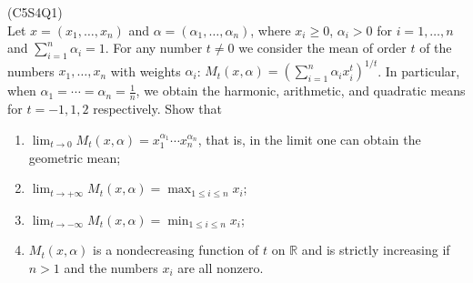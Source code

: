 \begin{prb}
    (C5S4Q1) \\
    Let $x = (x_1, \ldots, x_n)$ and $\alpha = (\alpha_1, \ldots, \alpha_n)$, where $x_i \geq 0$, $\alpha_i > 0$ for $i = 1, \ldots, n$ and $\sum_{i=1}^n \alpha_i = 1$. For any number $t \neq 0$ we consider the mean of order $t$ of the numbers $x_1, \ldots, x_n$ with weights $\alpha_i$: $M_t(x, \alpha) = \left( \sum_{i=1}^n \alpha_i x_i^t \right)^{1/t}$.
    In particular, when $\alpha_1 = \cdots = \alpha_n = \frac{1}{n}$, we obtain the harmonic, arithmetic, and quadratic means for $t = -1, 1, 2$ respectively.
    Show that
    \begin{enumerate}
        \item[a)] $\lim_{t \to 0} M_t(x, \alpha) = x_1^{\alpha_1} \cdots x_n^{\alpha_n}$, that is, in the limit one can obtain the geometric mean;
        \item[b)] $\lim_{t \to +\infty} M_t(x, \alpha) = \max_{1 \leq i \leq n} x_i$;
        \item[c)] $\lim_{t \to -\infty} M_t(x, \alpha) = \min_{1 \leq i \leq n} x_i$;
        \item[d)] $M_t(x, \alpha)$ is a nondecreasing function of $t$ on $\mathbb{R}$ and is strictly increasing if $n > 1$ and the numbers $x_i$ are all nonzero.
    \end{enumerate}
\end{prb}
